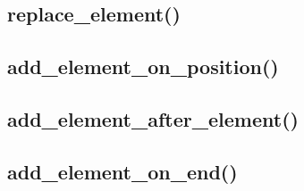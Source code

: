 \documentclass[12pt, a4paper]{article}
\begin{document}



\subsection{replace\_element()}






\subsection{add\_element\_on\_position()}






\subsection{add\_element\_after\_element()}






\subsection{add\_element\_on\_end()}


\end{document}
